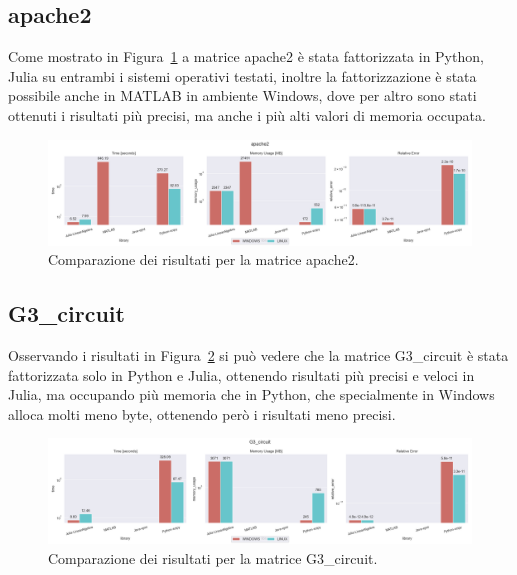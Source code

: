 \documentclass{report}
\begin{document}
            \subsection{apache2}
                Come mostrato in Figura~\ref{fig:apache2} a matrice apache2 è 
                stata fattorizzata in Python, Julia su entrambi i sistemi 
                operativi testati, inoltre la fattorizzazione è stata possibile
                anche in MATLAB in ambiente Windows, dove per altro sono stati 
                ottenuti i risultati più precisi, ma anche i più alti valori di 
                memoria occupata.
                \begin{figure}[h]
                    \includegraphics[width=\textwidth]{apache2}
                    \caption{Comparazione dei risultati per la matrice apache2.}
                    \label{fig:apache2}
                \end{figure}
            \subsection{G3\_circuit}
                Osservando i risultati in Figura~\ref{fig:G3_circuit} si può
                vedere che la matrice G3\_circuit è stata fattorizzata solo in
                Python e Julia, ottenendo risultati più precisi e veloci in 
                Julia, ma occupando più memoria che in Python, che specialmente
                in Windows alloca molti meno byte, ottenendo però i risultati
                meno precisi.
                \begin{figure}[h]
                    \includegraphics[width=\textwidth]{G3_circuit}
                    \caption{Comparazione dei risultati per la matrice G3\_circuit.}
                    \label{fig:G3_circuit}
                \end{figure}
\end{document}
